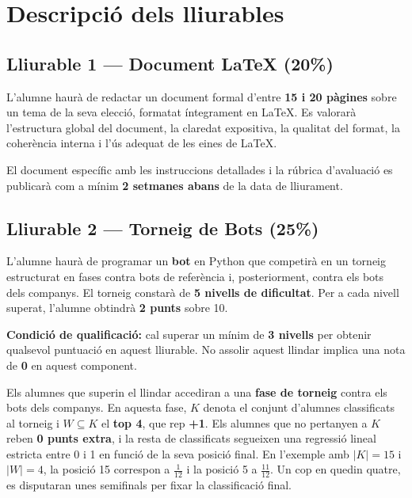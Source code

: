 \chapter{Descripci\'o dels lliurables}
\label{chap:lliurables}

\section{Lliurable 1 --- Document LaTeX (20\%)}

L'alumne haur\`a de redactar un document formal d'entre \textbf{15 i 20 p\`agines} sobre un tema de la seva elecci\'o, formatat \'integrament en LaTeX. Es valorar\`a l'estructura global del document, la claredat expositiva, la qualitat del format, la coher\`encia interna i l'\'us adequat de les eines de LaTeX.

El document espec\'ific amb les instruccions detallades i la r\'ubrica d'avaluaci\'o es publicar\`a com a m\'inim \textbf{2 setmanes abans} de la data de lliurament.

\section{Lliurable 2 --- Torneig de Bots (25\%)}

L'alumne haur\`a de programar un \textbf{bot} en Python que competir\`a en un torneig estructurat en fases contra bots de refer\`encia i, posteriorment, contra els bots dels companys. El torneig constar\`a de \textbf{5 nivells de dificultat}. Per a cada nivell superat, l'alumne obtindr\`a \textbf{2 punts} sobre 10.

\textbf{Condici\'o de qualificaci\'o:} cal superar un m\'inim de \textbf{3 nivells} per obtenir qualsevol puntuaci\'o en aquest lliurable. No assolir aquest llindar implica una nota de \textbf{0} en aquest component.

Els alumnes que superin el llindar accediran a una \textbf{fase de torneig} contra els bots dels companys. En aquesta fase, \(K\) denota el conjunt d'alumnes classificats al torneig i \(W \subseteq K\) el \textbf{top 4}, que rep \textbf{+1}. Els alumnes que no pertanyen a \(K\) reben \textbf{0 punts extra}, i la resta de classificats segueixen una regressi\'o lineal estricta entre 0 i 1 en funci\'o de la seva posici\'o final. En l'exemple amb \(|K|=15\) i \(|W|=4\), la posici\'o 15 correspon a \(\tfrac{1}{12}\) i la posici\'o 5 a \(\tfrac{11}{12}\). Un cop en quedin quatre, es disputaran unes semifinals per fixar la classificaci\'o final.

